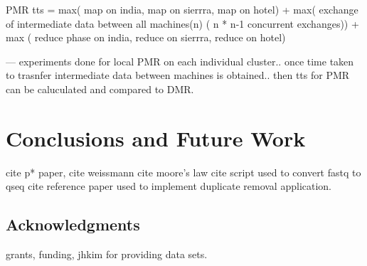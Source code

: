 \documentclass{acm_proc_article-sp}
\begin{document}
PMR tts = max( map  on india, map on  sierrra, map on hotel) + max( exchange of intermediate data between all machines(n) ( n * n-1 concurrent exchanges)) + max ( reduce phase on  india, reduce on  sierrra, reduce on hotel)

--- experiments done for local PMR on each individual cluster.. once time taken to trasnfer intermediate data between machines is obtained.. then tts for PMR can be caluculated and compared to DMR.



\section{Conclusions and Future Work}




%

%
%

cite p* paper,
cite weissmann
cite moore's law
cite script used to convert fastq to qseq
cite reference paper used to implement duplicate removal application.


\subsection*{Acknowledgments}
grants, funding, jhkim for providing data sets.
\end{document}
